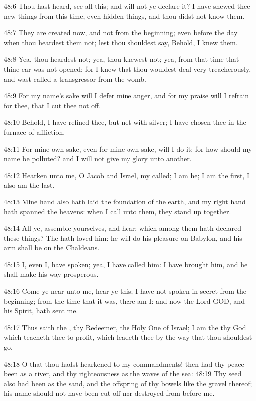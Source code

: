 48:6 Thou hast heard, see all this; and will not ye declare it? I have shewed thee new things from this time, even hidden things, and thou didst not know them.

48:7 They are created now, and not from the beginning; even before the day when thou heardest them not; lest thou shouldest say, Behold, I knew them.

48:8 Yea, thou heardest not; yea, thou knewest not; yea, from that time that thine ear was not opened: for I knew that thou wouldest deal very treacherously, and wast called a transgressor from the womb.

48:9 For my name's sake will I defer mine anger, and for my praise will I refrain for thee, that I cut thee not off.

48:10 Behold, I have refined thee, but not with silver; I have chosen thee in the furnace of affliction.

48:11 For mine own sake, even for mine own sake, will I do it: for how should my name be polluted? and I will not give my glory unto another.

48:12 Hearken unto me, O Jacob and Israel, my called; I am he; I am the first, I also am the last.

48:13 Mine hand also hath laid the foundation of the earth, and my right hand hath spanned the heavens: when I call unto them, they stand up together.

48:14 All ye, assemble yourselves, and hear; which among them hath declared these things? The \LORD hath loved him: he will do his pleasure on Babylon, and his arm shall be on the Chaldeans.

48:15 I, even I, have spoken; yea, I have called him: I have brought him, and he shall make his way prosperous.

48:16 Come ye near unto me, hear ye this; I have not spoken in secret from the beginning; from the time that it was, there am I: and now the Lord GOD, and his Spirit, hath sent me.

48:17 Thus saith the \LORD, thy Redeemer, the Holy One of Israel; I am the \LORD thy God which teacheth thee to profit, which leadeth thee by the way that thou shouldest go.

48:18 O that thou hadst hearkened to my commandments! then had thy peace been as a river, and thy righteousness as the waves of the sea: 48:19 Thy seed also had been as the sand, and the offspring of thy bowels like the gravel thereof; his name should not have been cut off nor destroyed from before me.

